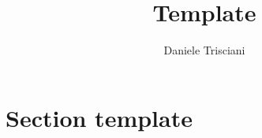 \documentclass[a4paper,onecolumn,11pt,unpublished]{article}
\title{Template}
\author{Daniele Trisciani}
\theoremstyle{definition}
\begin{document}
\maketitle
\setlength{\parindent}{0pt}

\section{Section template}



\end{document}

